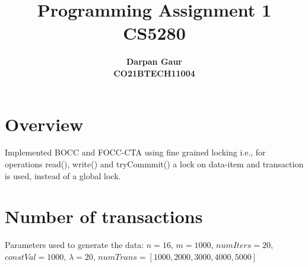 \documentclass[12pt]{article}
\title{
    \textbf{Programming Assignment 1} \\ 
    \textbf{CS5280} \\
}
\author{
    \textbf{Darpan Gaur} \\
    \textbf{CO21BTECH11004}
}
\date{}
\begin{document}
\maketitle

\hrulefill

\section*{Overview}
Implemented BOCC and FOCC-CTA using fine grained locking i.e., for operations read(), write() and tryCommmit() a lock on data-item and transaction is used, instead of a global lock.

\section*{Number of transactions}
Parameters used to generate the data:
$n=16$, $m=1000$, $numIters=20$, $constVal=1000$, $\lambda=20$, $numTrans = [1000, 2000, 3000, 4000, 5000]$
\end{document}
